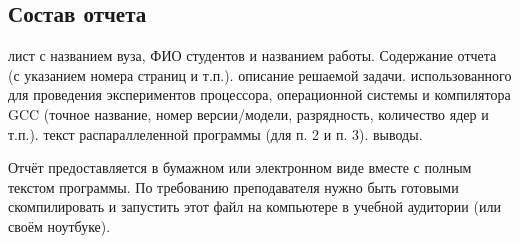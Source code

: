 \subsection{Состав отчета}
\begin{enumerate}
     лист с названием вуза, ФИО студентов и названием работы. Содержание отчета (с указанием номера страниц и т.п.).
     описание решаемой задачи.
     использованного для проведения экспериментов процессора, операционной системы и компилятора GCC (точное название, номер версии/модели, разрядность, количество ядер и т.п.).
     текст распараллеленной программы (для п. 2 и п. 3).
     выводы.
\end{enumerate}

Отчёт предоставляется в бумажном или электронном виде вместе с полным текстом программы. По требованию преподавателя нужно быть готовыми скомпилировать и запустить этот файл на компьютере в учебной аудитории (или своём ноутбуке).